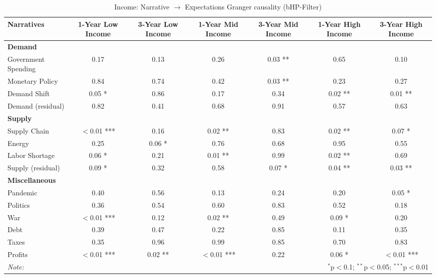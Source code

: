 \begin{sidewaystable}[H]
\centering
\footnotesize
\caption{Income: Narrative $\rightarrow$ Expectations Granger causality (bHP-Filter)}\label{tab:granger_bHP_income}

\begin{tabular}{lcccccc}
 \toprule
\textbf{Narratives} & \textbf{1-Year Low Income} & \textbf{3-Year Low Income} & \textbf{1-Year Mid Income} & \textbf{3-Year Mid Income} & \textbf{1-Year High Income} & \textbf{3-Year High Income} \\
\midrule
\multicolumn{7}{l}{\textbf{Demand}} \\
\midrule
Government Spending & 0.17 & 0.13 & 0.26 & 0.03 ** & 0.65 & 0.10 \\
Monetary Policy & 0.84 & 0.74 & 0.42 & 0.03 ** & 0.23 & 0.27 \\
Demand Shift & 0.05 * & 0.86 & 0.17 & 0.34 & 0.02 ** & 0.01 ** \\
Demand (residual) & 0.82 & 0.41 & 0.68 & 0.91 & 0.57 & 0.63 \\
\midrule
\multicolumn{7}{l}{\textbf{Supply}} \\
\midrule
Supply Chain & $<$0.01 *** & 0.16 & 0.02 ** & 0.83 & 0.02 ** & 0.07 * \\
Energy & 0.25 & 0.06 * & 0.76 & 0.68 & 0.95 & 0.55 \\
Labor Shortage & 0.06 * & 0.21 & 0.01 ** & 0.99 & 0.02 ** & 0.69 \\
Supply (residual) & 0.09 * & 0.32 & 0.58 & 0.07 * & 0.04 ** & 0.03 ** \\
\midrule
\multicolumn{7}{l}{\textbf{Miscellaneous}} \\
\midrule
Pandemic & 0.40 & 0.56 & 0.13 & 0.24 & 0.20 & 0.05 * \\
Politics & 0.36 & 0.54 & 0.60 & 0.83 & 0.52 & 0.18 \\
War & $<$0.01 *** & 0.12 & 0.02 ** & 0.49 & 0.09 * & 0.20 \\
Debt & 0.39 & 0.47 & 0.22 & 0.85 & 0.11 & 0.35 \\
Taxes & 0.35 & 0.96 & 0.99 & 0.85 & 0.70 & 0.83 \\
Profits & $<$0.01 *** & 0.02 ** & $<$0.01 *** & 0.22 & 0.06 * & $<$0.01 *** \\
\midrule
\bottomrule
\textit{Note:}  & \multicolumn{6}{r}{$^{*}$p$<$0.1; $^{**}$p$<$0.05; $^{***}$p$<$0.01} \\
\bottomrule
\end{tabular}
\end{sidewaystable}

